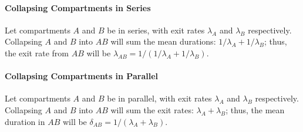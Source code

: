 \paragraph{Collapsing Compartments in Series}
Let compartments $A$ and $B$ be in series, with exit rates $\lambda_A$ and $\lambda_B$ respectively.
Collapsing $A$ and $B$ into $AB$ will sum the mean durations: $1/\lambda_A + 1/\lambda_B$;
thus, the exit rate from $AB$ will be $\lambda_{AB} = 1/(1/\lambda_A + 1/\lambda_B)$.
\paragraph{Collapsing Compartments in Parallel}
Let compartments $A$ and $B$ be in parallel, with exit rates $\lambda_A$ and $\lambda_B$ respectively.
Collapsing $A$ and $B$ into $AB$ will sum the exit rates: $\lambda_A + \lambda_B$;
thus, the mean duration in $AB$ will be $\delta_{AB} = 1/(\lambda_A + \lambda_B)$.
